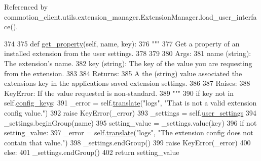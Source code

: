 Referenced by commotion\-\_\-client.\-utils.\-extension\-\_\-manager.\-Extension\-Manager.\-load\-\_\-user\-\_\-interface().


\begin{DoxyCode}
374 
375     \textcolor{keyword}{def }\hyperlink{classcommotion__client_1_1utils_1_1extension__manager_1_1ExtensionManager_a91552f94535d729789bcb7da471d90fe}{get\_property}(self, name, key):
376         \textcolor{stringliteral}{"""}
377 \textcolor{stringliteral}{        Get a property of an installed extension from the user settings.}
378 \textcolor{stringliteral}{}
379 \textcolor{stringliteral}{        }
380 \textcolor{stringliteral}{        Args:}
381 \textcolor{stringliteral}{          name (string): The extension's name.}
382 \textcolor{stringliteral}{          key (string): The key of the value you are requesting from the extension.}
383 \textcolor{stringliteral}{}
384 \textcolor{stringliteral}{        Returns:}
385 \textcolor{stringliteral}{          A the (string) value associated the extensions key in the applications saved extension settings.}
386 \textcolor{stringliteral}{        }
387 \textcolor{stringliteral}{        Raises:}
388 \textcolor{stringliteral}{          KeyError: If the value requested is non-standard.}
389 \textcolor{stringliteral}{        """}
390         \textcolor{keywordflow}{if} key \textcolor{keywordflow}{not} \textcolor{keywordflow}{in} self.\hyperlink{classcommotion__client_1_1utils_1_1extension__manager_1_1ExtensionManager_a72f3a3497a4593880a56e3952e674b13}{config\_keys}:
391             \_error = self.\hyperlink{classcommotion__client_1_1utils_1_1extension__manager_1_1ExtensionManager_a2cfd032ca383c3fd6f0f52b99b6dd67c}{translate}(\textcolor{stringliteral}{"logs"}, \textcolor{stringliteral}{"That is not a valid extension config value."})
392             \textcolor{keywordflow}{raise} KeyError(\_error)
393         \_settings = self.\hyperlink{classcommotion__client_1_1utils_1_1extension__manager_1_1ExtensionManager_a0fa8b2be1171ded73629a01c50472d34}{user\_settings}
394         \_settings.beginGroup(name)
395         setting\_value = \_settings.value(key)
396         \textcolor{keywordflow}{if} \textcolor{keywordflow}{not} setting\_value:
397             \_error = self.\hyperlink{classcommotion__client_1_1utils_1_1extension__manager_1_1ExtensionManager_a2cfd032ca383c3fd6f0f52b99b6dd67c}{translate}(\textcolor{stringliteral}{"logs"}, \textcolor{stringliteral}{"The extension config does not contain that value."})
398             \_settings.endGroup()
399             \textcolor{keywordflow}{raise} KeyError(\_error)
400         \textcolor{keywordflow}{else}:
401             \_settings.endGroup()
402             \textcolor{keywordflow}{return} setting\_value

\end{DoxyCode}
